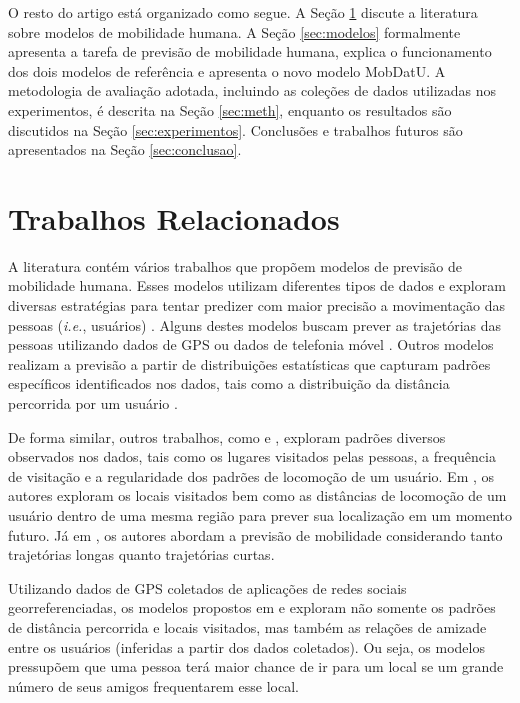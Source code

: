 \documentclass[10pt, a4paper, onecolumn, conference, compsocconf]{IEEEtran}
\begin{document}
O resto do artigo está organizado como segue. A Seção \ref{sec:trabalhos} discute a literatura sobre modelos de mobilidade humana. A Seção \ref{sec:modelos} formalmente apresenta a tarefa de previsão de mobilidade humana, explica o funcionamento dos dois modelos de referência e apresenta o novo modelo MobDatU. A metodologia de avaliação adotada, incluindo as coleções de dados utilizadas nos experimentos, é descrita na Seção \ref{sec:meth}, enquanto os resultados são discutidos na Seção \ref{sec:experimentos}. Conclusões e trabalhos futuros são apresentados na Seção \ref{sec:conclusao}.




\section{Trabalhos Relacionados}\label{sec:trabalhos}


A literatura contém vários trabalhos que propõem modelos de previsão de mobilidade humana. Esses modelos utilizam diferentes tipos de dados e exploram diversas estratégias para tentar predizer com maior precisão a movimentação das pessoas (\textit{i.e.}, usuários) \cite{Bui2014}. Alguns destes modelos buscam prever as trajetórias das pessoas utilizando dados de GPS \cite{Zheng2011} ou dados de telefonia móvel \cite{Dong2013}. Outros  modelos realizam a previsão a partir de distribuições estatísticas que capturam padrões específicos identificados nos dados, tais como a  distribuição da distância percorrida por um usuário  \cite{Kyunghan2009, Rhee2008}.%

De forma similar, outros trabalhos, como \cite{Hoyoung2008} e \cite{noulas2012}, exploram padrões diversos observados nos dados, tais como os lugares visitados pelas pessoas, a frequência de visitação e a regularidade dos padrões de locomoção de um usuário. Em \cite{noulas2011}, os autores exploram os locais visitados bem como as  distâncias de locomoção de um usuário dentro de uma mesma região  para prever sua localização em um momento futuro. Já em \cite{cho2011}, os autores abordam a previsão de mobilidade considerando tanto  trajetórias longas quanto trajetórias curtas.

Utilizando dados de GPS coletados de aplicações de redes sociais georreferenciadas, os modelos propostos em \cite{Musolesi2007} e \cite{Nguyen2012} exploram não somente os padrões de distância percorrida e locais visitados, mas também as relações de amizade  entre os usuários (inferidas a partir dos dados coletados). Ou seja, os modelos pressupõem que uma pessoa terá maior chance de ir para um local se um grande número de seus amigos frequentarem esse local. 
\end{document}
